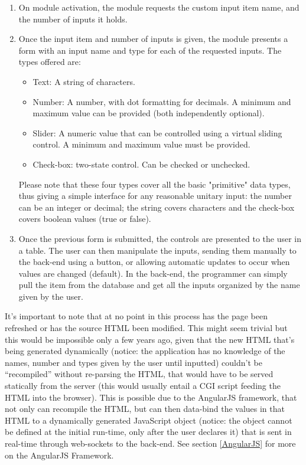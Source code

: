 \begin{enumerate}
	\item On module activation, the module requests the custom input item name, and the number of inputs it holds.
	\item Once the input item and number of inputs is given, the module presents a form with an input name and type for each 
	of the requested inputs. The types offered are:
		\begin{itemize}
			\item Text: A string of characters.
			\item Number: A number, with dot formatting for decimals. A minimum and maximum value can be provided (both 
			independently optional).
			\item Slider: A numeric value that can be controlled using a virtual sliding control. A minimum and maximum value 
			must be provided.
			\item Check-box: two-state control. Can be checked or unchecked.
		\end{itemize}
	Please note that these four types cover all the basic "primitive" data types, thus giving a simple interface for any 
	reasonable unitary input: the number can be an integer or decimal; the string covers characters and the check-box covers 
	boolean values (true or false).
	\item Once the previous form is submitted, the controls are presented to the user in a table. The user can then manipulate 
	the inputs, sending them manually to the back-end using a button, or allowing automatic updates to occur when values are 
	changed (default). In the back-end, the programmer can simply pull the item from the database and get all the inputs 
	organized by the name given by the user.
\end{enumerate}
It's important to note that at no point in this process has the page been refreshed or has the source HTML been modified. This 
might seem trivial but this would be impossible only a few years ago, given that the new HTML that's being generated 
dynamically (notice: the application has no knowledge of the names, number and types given by the user until inputted) 
couldn't be ``recompiled'' without re-parsing the HTML, that would have to be served statically from the server (this would 
usually entail a CGI script feeding the HTML into the browser). This is possible due to the AngularJS framework, that not only 
can recompile the HTML, but can then data-bind the values in that HTML to a dynamically generated JavaScript object (notice: 
the object cannot be defined at the initial run-time, only after the user declares it) that is sent in real-time through 
web-sockets to the back-end. See section \ref{AngularJS} for more on the AngularJS Framework.\\

